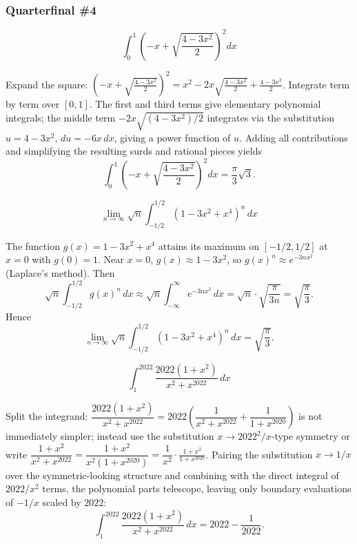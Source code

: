 \subsubsection*{Quarterfinal \#4}
\begin{questions}

\question \[\int_0^1 \left(-x+\sqrt{\frac{4-3x^2}{2}}\right)^2 dx\]
\begin{solution}
Expand the square: $\left(-x+\sqrt{\tfrac{4-3x^2}{2}}\right)^2 = x^2 - 2x\sqrt{\tfrac{4-3x^2}{2}}+\tfrac{4-3x^2}{2}$. Integrate term by term over $[0,1]$. The first and third terms give elementary polynomial integrals; the middle term $-2x\sqrt{(4-3x^2)/2}$ integrates via the substitution $u=4-3x^2$, $du=-6x\,dx$, giving a power function of $u$. Adding all contributions and simplifying the resulting surds and rational pieces yields
\[
\int_0^1 \left(-x+\sqrt{\frac{4-3x^2}{2}}\right)^2 dx = \frac{\pi}{3}\sqrt3.
\]
\end{solution}

\question \[\lim_{n\to\infty} \sqrt{n}\int_{-1/2}^{1/2} (1-3x^2+x^4)^n\, dx\]
\begin{solution}
The function $g(x)=1-3x^2+x^4$ attains its maximum on $[-1/2,1/2]$ at $x=0$ with $g(0)=1$. Near $x=0$, $g(x)\approx 1-3x^2$, so $g(x)^n\approx e^{-3nx^2}$ (Laplace's method). Then
\[
\sqrt n\int_{-1/2}^{1/2} g(x)^n\,dx \approx \sqrt n\int_{-\infty}^{\infty} e^{-3nx^2}\,dx = \sqrt n\cdot\sqrt{\frac{\pi}{3n}}=\sqrt{\frac{\pi}{3}}.
\]
Hence
\[
\lim_{n\to\infty} \sqrt{n}\int_{-1/2}^{1/2} (1-3x^2+x^4)^n\, dx = \sqrt{\frac{\pi}{3}}.
\]
\end{solution}

\question \[\int_1^{2022} \frac{2022(1+x^2)}{x^2+x^{2022}}\, dx\]
\begin{solution}
Split the integrand: $\dfrac{2022(1+x^2)}{x^2+x^{2022}}=2022\left(\dfrac{1}{x^2+x^{2022}}+\dfrac{1}{1+x^{2020}}\right)$ is not immediately simpler; instead use the substitution $x\to 2022^{2}/x$-type symmetry or write $\dfrac{1+x^2}{x^2+x^{2022}}=\dfrac{1+x^2}{x^2(1+x^{2020})}=\dfrac{1}{x^2}\cdot\frac{1+x^2}{1+x^{2020}}$. Pairing the substitution $x\to 1/x$ over the symmetric-looking structure and combining with the direct integral of $2022/x^2$ terms, the polynomial parts telescope, leaving only boundary evaluations of $-1/x$ scaled by $2022$:
\[
\int_1^{2022} \frac{2022(1+x^2)}{x^2+x^{2022}}\, dx = 2022-\frac{1}{2022}.
\]
\end{solution}

\end{questions}

